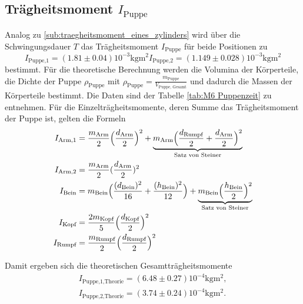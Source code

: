 \subsection{Trägheitsmoment $I_\text{Puppe}$}

\noindent Analog zu \ref{sub:traegheitsmoment_eines_zylinders} wird über die Schwingungsdauer $T$ das Trägheitsmoment $I_\text{Puppe}$ für beide Positionen zu
\begin{subequations}
	\begin{equation}
		\label{wert:Puppe1}
		I_\text{Puppe,1}=(1.81\pm0.04)10^{-3} \si{\kilo\gram\meter\squared}
	\end{equation}
	\begin{equation}
		\label{wert:Puppe2}
		I_\text{Puppe,2}=(1.149\pm0.028)10^{-3} \si{\kilo\gram\meter\squared}
	\end{equation}
\end{subequations}
bestimmt.
Für die theoretische Berechnung werden die Volumina der Körperteile, die Dichte der Puppe $\rho_\text{Puppe}$ 
mit $\rho_\text{Puppe}=\frac{m_\text{Puppe}}{V_\text{Puppe, Gesamt}}$ und dadurch die Massen der Körperteile bestimmt. 
Die Daten sind der Tabelle \ref{tab:M6 Puppenzeit} zu entnehmen.
Für die Einzelträgheitsmomente, deren Summe das Trägheitsmoment der Puppe ist, gelten die Formeln
\begin{align*}
	I_\text{Arm,1} &= \frac{m_\text{Arm}}{2}\Bigl(\frac{d_\text{Arm}}{2}\Bigr)^2+\underbrace{m_\text{Arm}\Bigl(\frac{d_\text{Rumpf}}{2}+\frac{d_\text{Arm}}{2}\Bigr)^2}_{\text{Satz von Steiner}}\\
	I_\text{Arm,2} &= \frac{m_\text{Arm}}{2}(\frac{d_\text{Arm}}{2})^2\\
	I_\text{Bein} &= m_\text{Bein}\Bigl(\frac{(d_\text{Bein})^2}{16}+\frac{(h_\text{Bein})^2}{12}\Bigr)+
	\underbrace{m_\text{Bein}\Bigl(\frac{h_\text{Bein}}{2}\Bigr)^2}_{\text{Satz von Steiner}}\\
	I_\text{Kopf} &= \frac{2m_\text{Kopf}}{5}\Bigl(\frac{d_\text{Kopf}}{2}\Bigr)^2\\
	I_\text{Rumpf} &= \frac{m_\text{Rumpf}}{2}\Bigl(\frac{d_\text{Rumpf}}{2}\Bigr)^2
\end{align*}
\begin{landscape}
	\centering
	
	
\end{landscape}

\noindent Damit ergeben sich die theoretischen Gesamtträgheitsmomente 
\begin{subequations}
	\label{wert:Puppe1T}
	\begin{align}
		I_\text{Puppe,1,Theorie}=(6.48\pm0.27)10^{-4}  \si{\kilo\gram\meter\squared},\\
		I_\text{Puppe,2,Theorie}=(3.74\pm0.24)10^{-4} \si{\kilo\gram\meter\squared}.
	\end{align}
\end{subequations}

